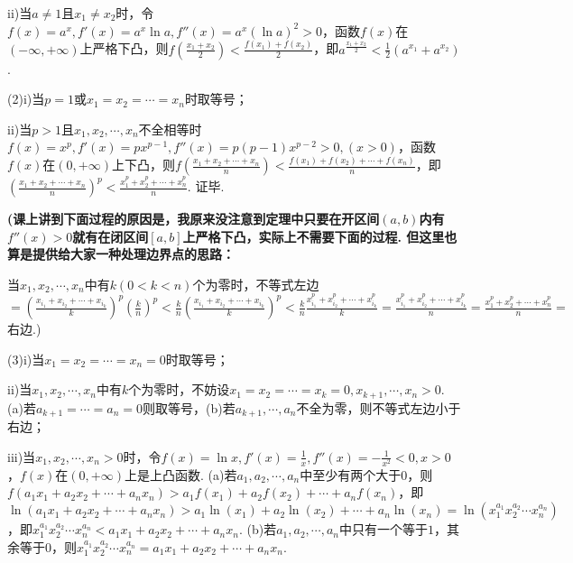 \documentclass[12pt,UTF8]{ctexart}
\begin{document}
\begin{enumerate}
ii)当$a\neq1$且$x_1\neq x_2$时，令$f(x)=a^x,f'(x)=a^x\ln a,f''(x)=a^x(\ln a)^2>0$，函数$f(x)$在$(-\infty,+\infty)$上严格下凸，则$f(\frac{x_1+x_2}2)<\frac{f(x_1)+f(x_2)}2$，即$a^{\frac{x_1+x_2}2}<\frac12(a^{x_1}+a^{x_2})$.

(2)i)当$p=1$或$x_1=x_2=\cdots=x_n$时取等号；

ii)当$p>1$且$x_1,x_2,\cdots,x_n$不全相等时$f(x)=x^p,f'(x)=px^{p-1},f''(x)=p(p-1)x^{p-2}>0,(x>0)$，函数$f(x)$在$(0,+\infty)$上下凸，则$f(\frac{x_1+x_2+\cdots+x_n}n)<\frac{f(x_1)+f(x_2)+\cdots+f(x_n)}n$，即$(\frac{x_1+x_2+\cdots+x_n}n)^p<\frac{x_1^p+x_2^p+\cdots+x_n^p}n$. 证毕. 

{\bf(课上讲到下面过程的原因是，我原来没注意到定理中只要在开区间$(a,b)$内有$f''(x)>0$就有在闭区间$[a,b]$上严格下凸，实际上不需要下面的过程. 但这里也算是提供给大家一种处理边界点的思路：

当$x_1,x_2,\cdots,x_n$中有$k(0<k<n)$个为零时，不等式左边$=(\frac{x_{i_1}+x_{i_2}+\cdots+x_{i_k}}k)^p(\frac kn)^p<\frac kn(\frac{x_{i_1}+x_{i_2}+\cdots+x_{i_k}}k)^p<\frac kn\frac{x_{i_1}^p+x_{i_2}^p+\cdots+x_{i_k}^p}k=\frac{x_{i_1}^p+x_{i_2}^p+\cdots+x_{i_k}^p}n=\frac{x_1^p+x_2^p+\cdots+x_n^p}n=$右边.)}

(3)i)当$x_1=x_2=\cdots=x_n=0$时取等号；

ii)当$x_1,x_2,\cdots,x_n$中有$k$个为零时，不妨设$x_1=x_2=\cdots=x_k=0,x_{k+1},\cdots,x_n>0$. (a)若$a_{k+1}=\cdots=a_n=0$则取等号，(b)若$a_{k+1},\cdots,a_n$不全为零，则不等式左边小于右边；

iii)当$x_1,x_2,\cdots,x_n>0$时，令$f(x)=\ln x,f'(x)=\frac1x,f''(x)=-\frac1{x^2}<0,x>0$，$f(x)$在$(0,+\infty)$上是上凸函数. (a)若$a_1,a_2,\cdots,a_n$中至少有两个大于$0$，则$f(a_1x_1+a_2x_2+\cdots+a_nx_n)>a_1f(x_1)+a_2f(x_2)+\cdots+a_nf(x_n)$，即$\ln(a_1x_1+a_2x_2+\cdots+a_nx_n)>a_1\ln(x_1)+a_2\ln(x_2)+\cdots+a_n\ln(x_n)=\ln(x_1^{a_1}x_2^{a_2}\cdots x_n^{a_n})$，即$x_1^{a_1}x_2^{a_2}\cdots x_n^{a_n}<a_1x_1+a_2x_2+\cdots+a_nx_n$. (b)若$a_1,a_2,\cdots,a_n$中只有一个等于$1$，其余等于$0$，则$x_1^{a_1}x_2^{a_2}\cdots x_n^{a_n}=a_1x_1+a_2x_2+\cdots+a_nx_n$.


\end{enumerate}
\end{document}
